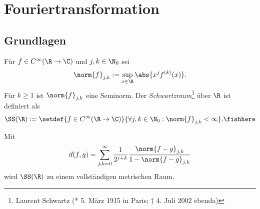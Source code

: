 \section{Fouriertransformation}

\subsection{Grundlagen}

\begin{defn}
\label{defn:2.1}
Für $f\in C^\infty(\R\to\C)$ und $j,k\in\N_0$ sei
\begin{align*}
\norm{f}_{j,k} := \sup\limits_{x\in\R} \abs{x^jf^{(k)}(x)}.
\end{align*}
Für $k\ge 1$ ist $\norm{f}_{j,k}$ eine Seminorm.
Der \emph{Schwartzraum}\footnote{Laurent Schwartz (* 5. März 1915 in Paris; †
4. Juli 2002 ebenda)} über $\R$ ist definiert als
\begin{align*}
\SS(\R) := \setdef{f\in C^\infty(\R\to\C)}{\forall j,k\in\N_0 :
\norm{f}_{j,k}<\infty}.\fishhere
\end{align*}
\end{defn}

\begin{bem}
\label{bem:2.2}
Mit
\begin{align*}
d(f,g) = \sum\limits_{j,k=0}^\infty
\frac{1}{2^{j+k}}\frac{\norm{f-g}_{j,k}}{1-\norm{f-g}_{j,k}}
\end{align*}
wird $\SS(\R)$ zu einem vollständigen metrischen Raum.\maphere
\end{bem}

